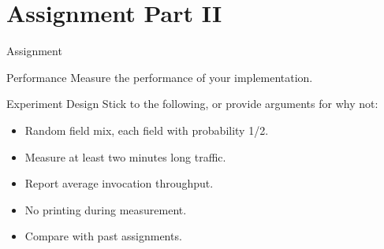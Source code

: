 \section{Assignment Part II}


\begin{frame}{Assignment}
    \begin{block}{Performance}
        Measure the performance of your implementation.
    \end{block}

    \bigskip

    \begin{block}{Experiment Design}
        Stick to the following, or provide arguments for why not:
        \begin{itemize}
            \item Random field mix, each field with probability 1/2.
            \item Measure at least two minutes long traffic.
            \item Report average invocation throughput.
            \item No printing during measurement.
            \item Compare with past assignments.
        \end{itemize}
    \end{block}
\end{frame}
